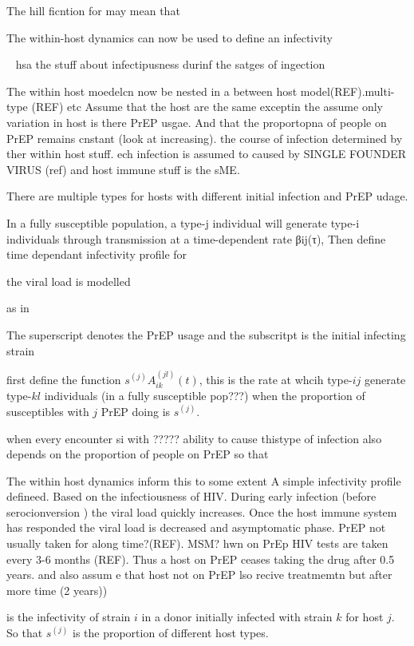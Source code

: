 \documentclass[DIV=15]{scrartcl}
\begin{document}
 The hill ficntion for may mean that   
  
  
The within-host dynamics can now be used to define an infectivity 

~\cite{hollingsworth2008} hsa the stuff about infectipusness durinf the satges of ingection


The  within host moedelcn now be nested  in a between host model(REF).multi-type (REF) etc  Assume that the host are the same exceptin the
assume only variation in host is there PrEP  usgae. And that the proportopna of people on PrEP  remains cnstant (look at increasing). the course of  infection determined by  ther within host stuff.  ech infection  is assumed to caused by  SINGLE  FOUNDER VIRUS (ref) and host immune stuff is  the sME. 


There are multiple types  for hosts with different initial  infection and PrEP udage.

In a fully susceptible population, a type-j
individual will generate type-i individuals through transmission
at a time-dependent rate βij(τ),
 Then define time dependant infectivity profile for 


the viral load is modelled 

as in 

The superscript denotes the PrEP  usage and the subscritpt  is the initial infecting strain

first define the function $s^{(j)}A^{(jl)}_{ik}(t)$, this is the rate at whcih type-$ij$ generate  type-$kl$ individuals (in a fully susceptible pop???) when the proportion  of susceptibles with $j$ PrEP doing is $s^{(j)}$.

when every encounter si with ????? ability to cause thistype of infection also depends on the proportion of people on PrEP so that 

The within host dynamics inform this to  some extent 
A simple infectivity profile defineed. Based on the infectiousness of  HIV. During early infection (before serocionversion  ) the viral load quickly  increases. Once the host immune system has responded the viral load is decreased and asymptomatic phase. PrEP not usually taken for   along time?(REF). MSM? hwn on PrEp HIV tests are taken every 3-6 months  (REF). Thus a host on PrEP ceases taking the drug after 0.5 years. and also  assum e  that host not on PrEP lso recive treatmemtn but after more time (2 years))


 is the infectivity of strain $i$ in a donor initially infected with strain $k$ for host $j$.  So that $s^{(j)}$ is the proportion of different host types.
\end{document}

